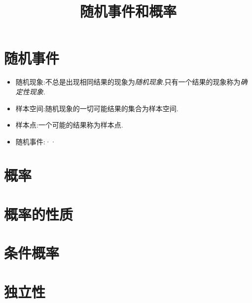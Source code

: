 \documentclass{ctexrep}
\begin{document}
\title{随机事件和概率}
\maketitle	

\section{随机事件}
	\begin{itemize}
		\item 随机现象:不总是出现相同结果的现象为\emph{随机现象}.只有一个结果的现象称为\emph{确定性现象}.\\
		\item 样本空间:随机现象的一切可能结果的集合为样本空间.\\
		\item 样本点:一个可能的结果称为样本点.
		\item 随机事件:··
	\end{itemize}
	
\section{概率}


\section{概率的性质}




\section{条件概率}


\section{独立性}
	
	
\end{document}
